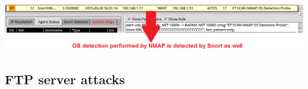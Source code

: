 \documentclass[11pt, a4paper]{article}
\begin{document}
$\;$ \\ \\
\noindent\begin{minipage}{\textwidth}
    \centering
    \includegraphics[width=\textwidth]{OS_Detection.png}
\end{minipage}

\subsection*{FTP server attacks}
\end{document}
